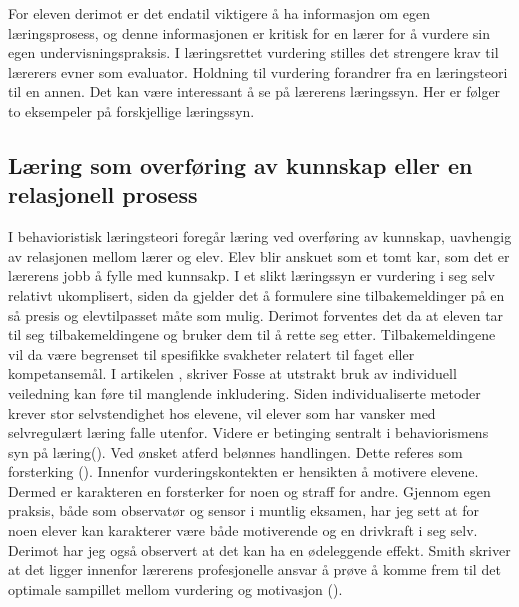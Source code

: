 \documentclass[main.tex]{subfiles}
\begin{document}
For eleven derimot er det endatil viktigere å ha informasjon om egen læringsprosess, og denne informasjonen er kritisk 
for en lærer for å vurdere sin egen undervisningspraksis. I læringsrettet vurdering stilles det strengere krav til 
lærerers evner som evaluator. Holdning til vurdering forandrer fra en læringsteori til en annen. Det kan være 
interessant å se på lærerens læringssyn. Her er følger to eksempeler på forskjellige læringssyn.

\subsection*{Læring som overføring av kunnskap eller en relasjonell prosess}

I behavioristisk læringsteori foregår læring ved overføring av kunnskap, uavhengig av relasjonen mellom lærer 
og elev. Elev blir anskuet som et tomt kar, som det er lærerens jobb å fylle med kunnsakp. 
I et slikt læringssyn er vurdering i seg selv relativt ukomplisert, siden da gjelder det å 
formulere sine tilbakemeldinger på en så presis og elevtilpasset måte som mulig.
Derimot forventes det da at eleven tar til seg tilbakemeldingene og bruker dem til å rette seg etter.
Tilbakemeldingene vil da være begrenset til spesifikke svakheter relatert til faget eller kompetansemål.
I artikelen , skriver Fosse at utstrakt bruk av individuell veiledning kan føre
til manglende inkludering. Siden individualiserte metoder krever stor selvstendighet hos elevene, vil
elever som har vansker med selvregulært læring falle utenfor. Videre er betinging sentralt i behaviorismens 
syn på læring(). Ved ønsket atferd belønnes handlingen. Dette referes som forsterking 
(). Innenfor vurderingskontekten er hensikten å motivere elevene. Dermed er karakteren en 
forsterker for noen og straff for andre. Gjennom egen praksis, både som observatør og sensor i muntlig eksamen,
har jeg sett at for noen elever kan karakterer være både motiverende og en drivkraft i seg selv. Derimot
har jeg også observert at det kan ha en ødeleggende effekt. Smith skriver at det ligger innenfor
lærerens profesjonelle ansvar å prøve å komme frem til det optimale sampillet mellom vurdering og 
motivasjon ().
\end{document}
